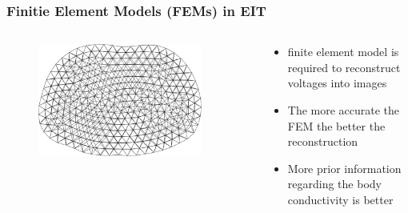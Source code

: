 \documentclass[10pt,    %
    english,            %
    xcolor=table,       %
    envcountsect,        %
    aspectratio=1610
]{beamer}
\begin{document}
\begin{frame}
	\frametitle{Finitie Element Models (FEMs) in EIT}    
	\begin{columns}[c]
		\begin{column}{0.5\textwidth}
			\begin{figure}[H]
				\centering
				\includegraphics[width=0.9\textwidth]{human_mesh_empty.png}
			\end{figure}
		\end{column}
		\begin{column}{0.5\textwidth}
			\begin{itemize}
				\item finite element model is required to reconstruct voltages into images
				\item \alert{The more accurate the FEM the better the reconstruction} 
				\item More prior information regarding the body conductivity is better
			\end{itemize}
		\end{column}
	\end{columns}
\end{frame}
\end{document}
